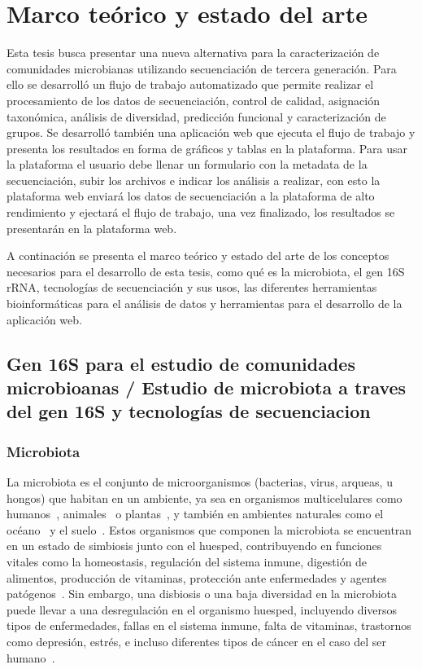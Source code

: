 \chapter{Marco teórico y estado del arte}


Esta tesis busca presentar una nueva alternativa para la caracterización de comunidades microbianas utilizando secuenciación de tercera generación. Para ello se  desarrolló un flujo de trabajo automatizado que permite realizar el procesamiento de los datos de secuenciación, control de calidad, asignación taxonómica, análisis de diversidad, predicción funcional y caracterización de grupos. 
Se desarrolló también una aplicación web que ejecuta el flujo de trabajo y presenta los resultados en forma de gráficos y tablas en la plataforma. Para usar la plataforma el usuario debe llenar un formulario con la metadata de la secuenciación, subir los archivos e indicar los análisis a realizar, con esto la plataforma web enviará los datos de secuenciación a la plataforma de alto rendimiento y ejectará el flujo de trabajo, una vez finalizado, los resultados se presentarán en la plataforma web.

A continación se presenta el marco teórico y estado del arte de los conceptos necesarios para el desarrollo de esta tesis, como qué es la microbiota, el gen 16S rRNA, tecnologías de secuenciación y sus usos, las diferentes herramientas bioinformáticas para el análisis de datos y herramientas para el desarrollo de la aplicación web.
\section{Gen 16S para el estudio de comunidades microbioanas /  Estudio de microbiota a traves del gen 16S y tecnologías de secuenciacion}
\subsection{Microbiota}
La microbiota es el conjunto de microorganismos (bacterias, virus, arqueas, u hongos) que habitan en un ambiente, ya sea en organismos multicelulares como humanos~\cite{gilbert2018current}, animales~\cite{bahrndorff2016microbiome} o plantas~\cite{berendsen2012rhizosphere}, y también en ambientes naturales como el océano~\cite{doi:10.1126/science.aac8455} y el suelo~\cite{banerjee2023soil}. Estos organismos que componen la microbiota se encuentran en un estado de simbiosis junto con el huesped, contribuyendo en funciones vitales como la homeostasis, regulación del sistema inmune, digestión de alimentos, producción de vitaminas, protección ante enfermedades y agentes patógenos~\cite{marco2021defining,fijan2014microorganisms,altvecs2020interaction,hou2022microbiota}. Sin embargo, una disbiosis o una baja diversidad en la microbiota puede llevar a una desregulación en el organismo huesped, incluyendo diversos tipos de enfermedades, fallas en el sistema inmune, falta de vitaminas, trastornos como depresión, estrés, e incluso diferentes tipos de cáncer en el caso del ser humano~\cite{altvecs2020interaction,hou2022microbiota}.

